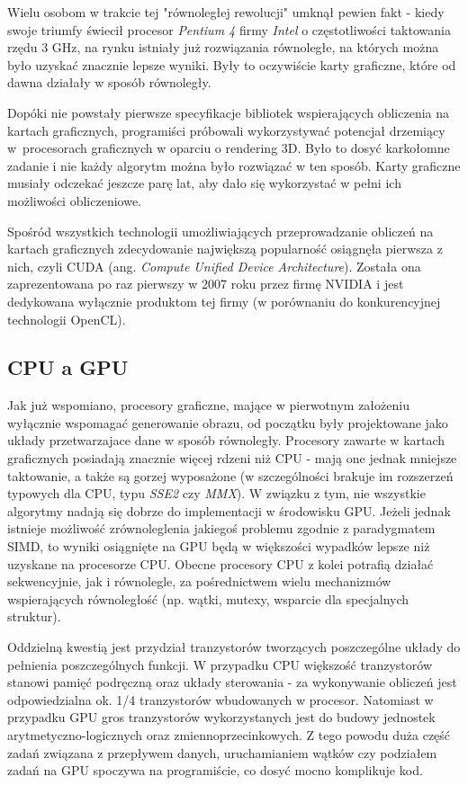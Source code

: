 \documentclass[12pt]{article}
\begin{document}
Wielu osobom w trakcie tej "równoległej rewolucji" umknął pewien fakt - kiedy swoje triumfy świecił procesor \textit{Pentium 4} firmy \textit{Intel} o częstotliwości taktowania rzędu 3 GHz, na rynku istniały już rozwiązania równoległe, na których można było uzyskać znacznie lepsze wyniki. Były to oczywiście karty graficzne, które od dawna działały w sposób równoległy. 

Dopóki nie powstały pierwsze specyfikacje bibliotek wspierających obliczenia na kartach graficznych, programiści próbowali wykorzystywać potencjał drzemiący w~procesorach graficznych w oparciu o rendering 3D. Było to dosyć karkołomne zadanie i nie każdy algorytm można było rozwiązać w ten sposób. Karty graficzne musiały odczekać jeszcze parę lat, aby dało się wykorzystać w pełni ich możliwości obliczeniowe.

Spośród wszystkich technologii umożliwiających przeprowadzanie obliczeń na kartach graficznych zdecydowanie największą popularność osiągnęła pierwsza z nich, czyli CUDA (ang. \textit{Compute Unified Device Architecture}). Została ona zaprezentowana po raz pierwszy w 2007 roku przez firmę NVIDIA i jest dedykowana wyłącznie produktom tej firmy (w porównaniu do konkurencyjnej technologii OpenCL).

\subsection{CPU a GPU}

Jak już wspomiano, procesory graficzne, mające w pierwotnym założeniu wyłącznie wspomagać generowanie obrazu, od początku były projektowane jako układy przetwarzajace dane w sposób równoległy. Procesory zawarte w kartach graficznych posiadają znacznie więcej rdzeni niż CPU - mają one jednak mniejsze taktowanie, a także są gorzej wyposażone (w szczególności brakuje im rozszerzeń typowych dla CPU, typu \textit{SSE2} czy \textit{MMX}). W związku z tym, nie wszystkie algorytmy nadają się dobrze do implementacji w środowisku GPU. Jeżeli jednak istnieje możliwość zrównoleglenia jakiegoś problemu zgodnie z paradygmatem SIMD, to wyniki osiągnięte na GPU będą w większości wypadków lepsze niż uzyskane na procesorze CPU. Obecne procesory CPU z kolei potrafią działać sekwencyjnie, jak i równolegle, za pośrednictwem wielu mechanizmów wspierających równoległość (np. wątki, mutexy, wsparcie dla specjalnych struktur).

Oddzielną kwestią jest przydział tranzystorów tworzących poszczególne układy do pełnienia poszczególnych funkcji. W przypadku CPU większość tranzystorów stanowi pamięć podręczną oraz układy sterowania - za wykonywanie obliczeń jest odpowiedzialna ok. 1/4 tranzystorów wbudowanych w procesor. Natomiast w przypadku GPU gros tranzystorów wykorzystanych jest do budowy jednostek arytmetyczno-logicznych oraz zmiennoprzecinkowych. Z tego powodu duża część zadań związana z przepływem danych, uruchamianiem wątków czy podziałem zadań na GPU spoczywa na programiście, co dosyć mocno komplikuje kod.
\end{document}
